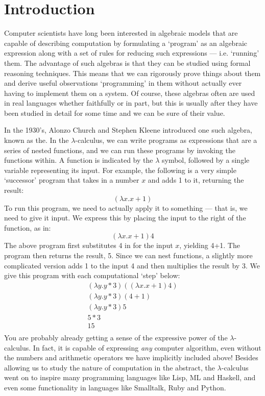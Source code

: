 \chapter{Introduction}\label{Introduction}
	Computer scientists have long been interested in algebraic models that are capable of describing computation by formulating a `program' as an algebraic expression along with a set of rules for reducing such expressions ---  i.e. `running' them.  
The advantage of such algebras is that they can be studied using formal reasoning techniques.  
This means that we can rigorously prove things about them and derive useful observations `programming' in them without actually ever having to implement them on a system.  
Of course, these algebras often are used in real languages whether faithfully or in part, but this is usually after they have been studied in detail for some time and we can be sure of their value.
	
	In the 1930's, Alonzo Church and Stephen Kleene introduced one such algebra, known as the.  
In the $\lambda$-calculus, we can write programs as expressions that are a series of nested functions, and we can run these programs by invoking the functions within.  
A function is indicated by the $\lambda$ symbol, followed by a single variable representing its input.  
For example, the following is a very simple `successor' program that takes in a number $x$ and adds 1 to it, returning the result:
	\[
		(\lambda x. x + 1)
	\]
To run this program, we need to actually apply it to something ---  that is, we need to give it input.  
We express this by placing the input to the right of the function, as in:
\[
	(\lambda x. x + 1) 4
\]
The above program first substitutes 4 in for the input $x$, yielding 4+1.  
The program then returns the result, 5.  
Since we can nest functions, a slightly more complicated version adds 1 to the input 4 and then multiplies the result by 3.  
We give this program with each computational `step' below:
\begin{align*}
	(\lambda y. y * 3) ((\lambda x. x + 1) 4)\\
	(\lambda y. y * 3) (4+1)\\
	(\lambda y. y * 3) 5\\
	5 * 3\\
	15\\
\end{align*}
You are probably already getting a sense of the expressive power of the $\lambda$-calculus.  
In fact, it is capable of expressing \emph{any} computer algorithm, even without the numbers and arithmetic operators we have implicitly included above!  Besides allowing us to study the nature of computation in the abstract, the $\lambda$-calculus went on to inspire many programming languages like Lisp, ML and Haskell, and even some functionality in languages like Smalltalk, Ruby and Python.
